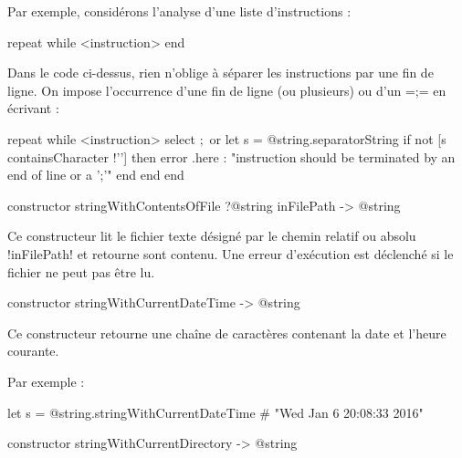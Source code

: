 Par exemple, considérons l'analyse d'une liste d'instructions :

\begin{galgas}
repeat
while
  <instruction>
end
\end{galgas}

Dans le code ci-dessus, rien n'oblige à séparer les instructions par une fin de ligne. On impose l'occurrence d'une fin de ligne (ou plusieurs) ou d'un \ggs=;= en écrivant :

\begin{galgas}
repeat
while
  <instruction>
  select
   $;$
  or
    let s = @string.separatorString 
    if not [s containsCharacter !'\n'] then
      error .here
       : "instruction should be terminated by an end of line or a ';'"
    end
  end
end
\end{galgas}




\begin{galgasbox}
constructor stringWithContentsOfFile ?@string inFilePath -> @string
\end{galgasbox}

Ce constructeur lit le fichier texte désigné par le chemin relatif ou absolu \ggs!inFilePath! et retourne sont contenu. Une erreur d'exécution est déclenché si le fichier ne peut pas être lu.







\begin{galgasbox}
constructor stringWithCurrentDateTime -> @string
\end{galgasbox}

Ce constructeur retourne une chaîne de caractères contenant la date et l'heure courante.

Par exemple :
\begin{galgas}
let s = @string.stringWithCurrentDateTime # "Wed Jan  6 20:08:33 2016"
\end{galgas}








\begin{galgasbox}
constructor stringWithCurrentDirectory -> @string
\end{galgasbox}

